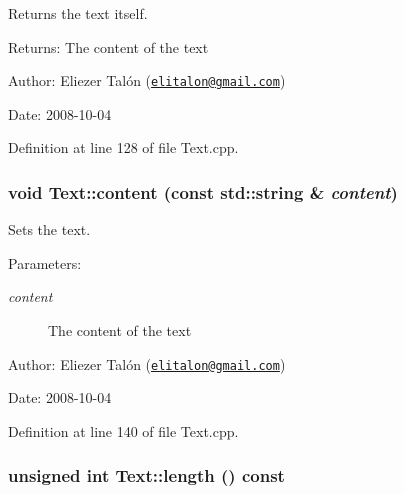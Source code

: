 Returns the text itself. 

\begin{Desc}
\item[Returns:]The content of the text\end{Desc}
\begin{Desc}
\item[Author:]Eliezer Talón (\href{mailto:elitalon@gmail.com}{\tt elitalon@gmail.com}) \end{Desc}
\begin{Desc}
\item[Date:]2008-10-04 \end{Desc}


Definition at line 128 of file Text.cpp.\hypertarget{class_text_eca454f28010b6b3e7bd0d771b8eaeb2}{
\subsubsection[content]{\setlength{\rightskip}{0pt plus 5cm}void Text::content (const std::string \& {\em content})}}
\label{class_text_eca454f28010b6b3e7bd0d771b8eaeb2}


Sets the text. 

\begin{Desc}
\item[Parameters:]
\begin{description}
\item[{\em content}]The content of the text\end{description}
\end{Desc}
\begin{Desc}
\item[Author:]Eliezer Talón (\href{mailto:elitalon@gmail.com}{\tt elitalon@gmail.com}) \end{Desc}
\begin{Desc}
\item[Date:]2008-10-04 \end{Desc}


Definition at line 140 of file Text.cpp.\hypertarget{class_text_8d76db538f8617fb8880ba3e4ff3e6a5}{
\subsubsection[length]{\setlength{\rightskip}{0pt plus 5cm}unsigned int Text::length () const}}
\label{class_text_8d76db538f8617fb8880ba3e4ff3e6a5}


